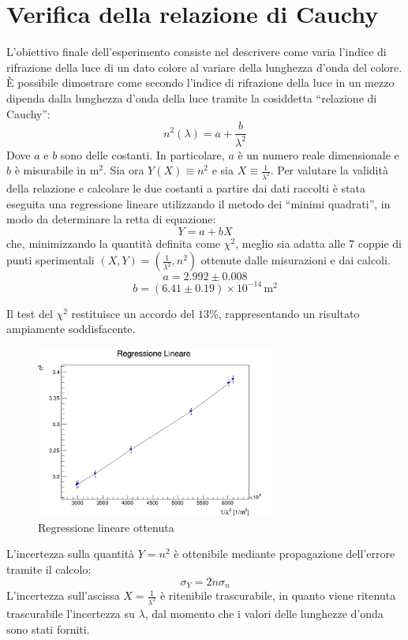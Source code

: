 \documentclass[a4paper,12pt]{article}
\begin{document}
\section{Verifica della relazione di Cauchy}
L’obiettivo finale dell’esperimento consiste nel descrivere come varia l’indice di rifrazione della luce di un dato colore al variare della lunghezza d’onda del colore. 
È possibile dimostrare come secondo l’indice di rifrazione della luce in un mezzo dipenda dalla lunghezza d’onda della luce tramite la cosiddetta “relazione di Cauchy”:
\[
n^2(\lambda) = a + \frac{b}{\lambda^2}
\]
Dove \( a \) e \( b \) sono delle costanti. In particolare, \( a \) è un numero reale dimensionale e \( b \) è misurabile in \( \text{m}^2 \). 
Sia ora \( Y(X) \equiv n^2 \) e sia \( X \equiv \frac{1}{\lambda^2} \).
Per valutare la validità della relazione e calcolare le due costanti a partire dai dati raccolti è stata eseguita una regressione lineare utilizzando il metodo dei “minimi quadrati”, in modo da determinare la retta di equazione:
\[
Y = a + bX
\]
che, minimizzando la quantità definita come \( \chi^2 \), meglio sia adatta alle 7 coppie di punti sperimentali \( (X, Y) = \left(\frac{1}{\lambda^2}, n^2\right) \) ottenute dalle misurazioni e dai calcoli.
\[
a = 2.992 \pm 0.008
\]
\[
b = (6.41 \pm 0.19) \times 10^{-14} \, \text{m}^2
\]

Il test del \( \chi^2 \) restituisce un accordo del \( 13\% \), rappresentando un risultato ampiamente soddisfacente.

\begin{figure}[H]
    \centering
    \includegraphics[width=0.7\textwidth]{image.png}
    \caption{Regressione lineare ottenuta}
    \label{fig:regressione}
\end{figure}

L’incertezza sulla quantità \( Y = n^2 \) è ottenibile mediante propagazione dell’errore tramite il calcolo:
\[
\sigma_Y = 2n \sigma_n
\]
L’incertezza sull’ascissa \( X = \frac{1}{\lambda^2} \) è ritenibile trascurabile, in quanto viene ritenuta trascurabile l’incertezza su \( \lambda \), dal momento che i valori delle lunghezze d’onda sono stati forniti.
\end{document}
